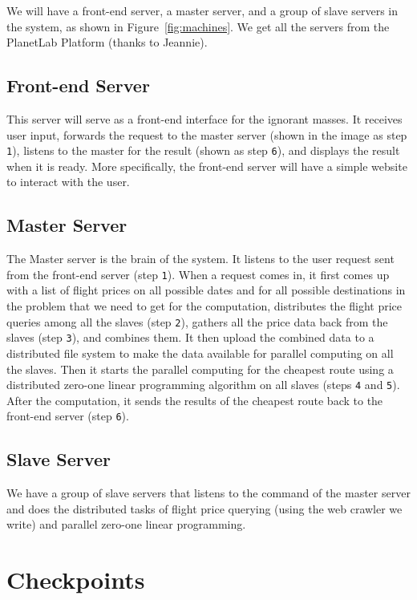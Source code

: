 \documentclass{article}
\begin{document}
We will have a front-end server, a master server, and a group of slave servers in the system, as shown in Figure~\ref{fig:machines}. We get all the
servers from the PlanetLab Platform (thanks to Jeannie).

\subsection{Front-end Server}
This server will serve as a front-end interface for the ignorant masses. It receives user input, forwards the request to the master server (shown in
the image as step \texttt{1}), listens to the master for the result (shown as step \texttt{6}), and displays the result when it is ready. More
specifically, the front-end server will have a simple website to interact with the user.

\subsection{Master Server}
The Master server is the brain of the system. It listens to the user request sent from the front-end server (step \texttt{1}). When a request comes
in, it first comes up with a list of flight prices on all possible dates and for all possible destinations in the problem that we need to get for the
computation, distributes the flight price queries among all the slaves (step \texttt{2}), gathers all the price data back from the slaves (step
\texttt{3}), and combines them. It then upload the combined data to a distributed file system to make the data available for parallel computing on all
the slaves. Then it starts the parallel computing for the cheapest route using a distributed zero-one linear programming algorithm on all slaves
(steps \texttt{4} and \texttt{5}). After the computation, it sends the results of the cheapest route back to the front-end server (step \texttt{6}).

\subsection{Slave Server}
We have a group of slave servers that listens to the command of the master server and does the distributed tasks of flight price querying (using the
web crawler we write) and parallel zero-one linear programming.

\section{Checkpoints}
\end{document}
